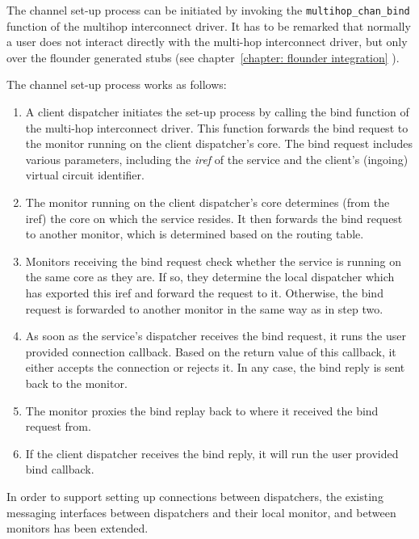 \documentclass[a4paper,twoside]{report} %
\begin{document}
The channel set-up process can be initiated by invoking the \texttt{multihop\_chan\_bind} function of the multihop interconnect driver. It has to be remarked that normally a user does not interact directly with the multi-hop interconnect driver, but only over the flounder generated stubs (see chapter~\ref{chapter: flounder integration} ).


The channel set-up process works as follows:

\begin{enumerate}

\item A client dispatcher initiates the set-up process by calling the bind function of the multi-hop interconnect driver. This function forwards the bind request to the monitor running on the client dispatcher's core. The bind request includes various parameters, including the \emph{iref} of the service and the client's (ingoing) virtual circuit identifier.

\item The monitor running on the client dispatcher's core determines (from the iref) the core on which the service resides. It then forwards the bind request to another monitor, which is determined based on the routing table.

\item Monitors receiving the bind request check whether the service is running on the same core as they are. If so, they determine the local dispatcher which has exported this iref and forward the request to it. Otherwise, the bind request is forwarded to another monitor in the same way as in step two.

\item As soon as the service's dispatcher receives the bind request, it runs the user provided connection callback. Based on the return value of this callback, it either accepts the connection or rejects it. In any case, the bind reply is sent back to the monitor.

\item The monitor proxies the bind replay back to where it received the bind request from.

\item If the client dispatcher receives the bind reply, it will run the user provided bind callback.

\end{enumerate}

In order to support setting up connections between dispatchers, the existing messaging interfaces between dispatchers and their local monitor, and between monitors has been extended.
\end{document}
